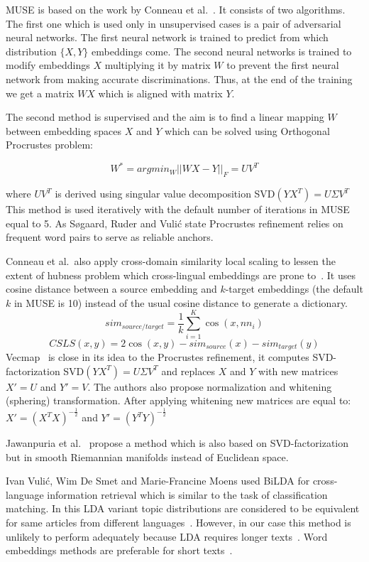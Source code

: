 \documentclass[11pt,a4paper]{article}
\begin{document}
MUSE is based on the work by Conneau et al.~\cite{muse}. It consists of two algorithms. The first one which is used only in unsupervised cases is a pair of adversarial neural networks. The first neural network is trained to predict from which distribution $\{X, Y\}$ embeddings come. The second neural networks is trained to modify embeddings $X$ multiplying it by matrix $W$ to prevent the first neural network from making accurate discriminations. Thus, at the end of the training we get a matrix $WX$ which is aligned with matrix $Y$.

The second method is supervised and the aim is to find a linear mapping $W$ between embedding spaces $X$ and $Y$ which can be solved using Orthogonal Procrustes problem:

$$ W^* = argmin_W ||WX - Y||_F = UV^T$$

where $UV^T$ is derived using singular value decomposition SVD$(YX^T) = U \Sigma V^T$
This method is used iteratively with the default number of iterations in MUSE equal to 5. As Søgaard, Ruder and Vulić state Procrustes refinement relies on frequent word pairs to serve as reliable anchors.

Conneau et al.\ also apply cross-domain similarity local scaling to lessen the extent of hubness problem which cross-lingual embeddings are prone to~\cite{dinu}. It uses cosine distance between a source embedding and $k$-target embeddings (the default $k$ in MUSE is 10) instead of the usual cosine distance to generate a dictionary.
$$sim_{source/target} = \dfrac{1}{k}\sum_{i=1}^K\cos(x, nn_i)$$
\small
$$CSLS(x,y) = 2\cos(x,y) - sim_{source}(x)  - sim_{target}(y)$$
\normalsize
Vecmap~\cite{vecmap} is close in its idea to the Procrustes refinement, it computes SVD-factorization SVD$(YX^T) = U\Sigma V^T$ and replaces $X$ and $Y$ with new matrices $X' = U$ and $Y' = V$. The authors also propose normalization and whitening (sphering) transformation. After applying whitening new matrices are equal to:
$X' = {({X^T}X)}^{-\tfrac{1}{2}}$ and $Y' = {({Y^T}Y)}^{-\tfrac{1}{2}}$

Jawanpuria et al.~\cite{jawanpuria} propose a method which is also based on SVD-factorization but in smooth Riemannian manifolds instead of Euclidean space.

Ivan Vulić, Wim De Smet and Marie-Francine Moens  used BiLDA for cross-language information retrieval which is similar to the task of classification matching. In this LDA variant topic distributions are considered to be equivalent for same articles from different languages~\cite{bilda}. However, in our case this method is unlikely to perform adequately because LDA requires longer texts~\cite{short-lda}. Word embeddings methods are preferable for short texts~\cite{maslova-potapov}.
\end{document}
